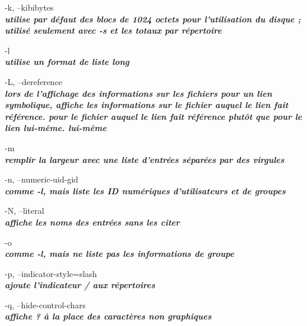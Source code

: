 \documentclass{article}
\begin{document}
       \par-k, --kibibytes\\
              \textit{\textbf{ utilise par défaut des blocs de 1024 octets pour l'utilisation du disque ; utilisé seulement avec -s
              et les totaux par répertoire}}\\

      \par -l \\   \textit{\textbf{ utilise un format de liste long}}\\

      \par -L, --dereference\\  
             \textit{\textbf{ lors de l'affichage des informations sur les fichiers pour un lien symbolique, affiche les informations sur le fichier auquel le lien fait référence.
              pour le fichier auquel le lien fait référence plutôt que pour le lien lui-même.
              lui-même}}\\

       \par-m\\   \textit{\textbf{remplir la largeur avec une liste d'entrées séparées par des virgules}}\\

       \par -n, --numeric-uid-gid\\  
               \textit{\textbf{comme -l, mais liste les ID numériques d'utilisateurs et de groupes}}\\

        \par-N, --literal\\  
              \textit{\textbf{affiche les noms des entrées sans les citer}}\\

       \par -o \\      \textit{\textbf{comme -l, mais ne liste pas les informations de groupe}}\\

       \par -p, --indicator-style=slash \\ 
              \textit{\textbf{ajoute l'indicateur / aux répertoires}}\\

        \par-q, --hide-control-chars\\
              \textit{\textbf{affiche ? à la place des caractères non graphiques}}\\
\end{document}
